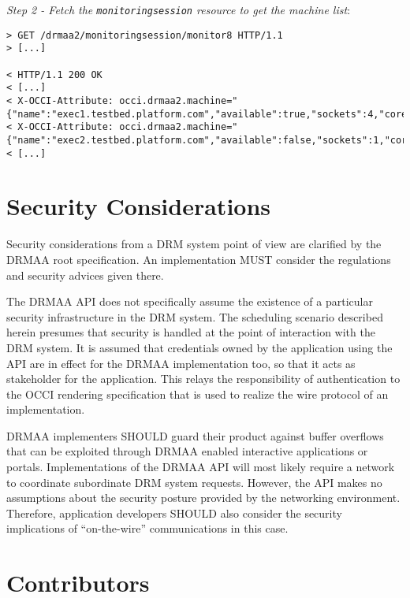 \documentclass[10pt]{article}
\newcommand{\h}[1]{\lstinline|#1|}
\begin{document}
\emph{Step 2 - Fetch the \h{monitoringsession} resource to get the machine list}:

\begin{verbatim}
> GET /drmaa2/monitoringsession/monitor8 HTTP/1.1
> [...]

< HTTP/1.1 200 OK 
< [...]
< X-OCCI-Attribute: occi.drmaa2.machine="{"name":"exec1.testbed.platform.com","available":true,"sockets":4,"coresPerSocket":4,"threadsPerCore":2,"load":0.1,"physMemory":512000,"virtMemory":1000000,"machineOS":"LINUX",...}"
< X-OCCI-Attribute: occi.drmaa2.machine="{"name":"exec2.testbed.platform.com","available":false,"sockets":1,"coresPerSocket":4,"threadsPerCore":1,"load":1.5,"physMemory":1000000,"virtMemory":2000000,"machineOS":"LINUX",...}"
< [...]
\end{verbatim}

\section{Security Considerations}
\label{sec:security}

Security considerations from a DRM system point of view are clarified by the DRMAA root specification. An implementation MUST consider the regulations and security advices given there. 

The DRMAA API does not specifically assume the existence of a particular security infrastructure in the DRM system. The scheduling scenario described herein presumes that security is handled at the point of interaction with the DRM system. It is assumed that credentials owned by the application using the API are in effect for the DRMAA implementation too, so that it acts as stakeholder for the application. This relays the responsibility of authentication to the OCCI rendering specification that is used to realize the wire protocol of an implementation.

DRMAA implementers SHOULD guard their product against buffer overflows that can be exploited through DRMAA enabled interactive applications or portals. Implementations of the DRMAA API will most likely require a network to coordinate subordinate DRM system requests. However, the API makes no assumptions about the security posture provided by the networking environment. Therefore, application developers SHOULD also consider the security implications of \enquote{on-the-wire} communications in this case.

\section{Contributors}
\end{document}
